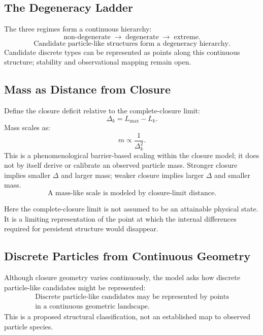 \subsection{The Degeneracy Ladder}

The three regimes form a continuous hierarchy:
\begin{equation}
  \text{non-degenerate} \;\rightarrow\; \text{degenerate} \;\rightarrow\; \text{extreme.}
\end{equation}
\begin{equation}
  \boxed{\text{Candidate particle-like structures form a degeneracy hierarchy.}}
\end{equation}
Candidate discrete types can be represented as points along this continuous
structure; stability and observational mapping remain open.

\subsection{Mass as Distance from Closure}

Define the closure deficit relative to the complete-closure limit:
\begin{equation}
  \Delta_k = L_{\max} - L_k.
\end{equation}
Mass scales as:
\begin{equation}
  \label{eq:mass}
  m \propto \frac{1}{\Delta_k^2}.
\end{equation}
This is a phenomenological barrier-based scaling within the closure model; it
does not by itself derive or calibrate an observed particle mass.
Stronger closure implies smaller $\Delta$ and larger mass;
weaker closure implies larger $\Delta$ and smaller mass.
\begin{equation}
  \boxed{\text{A mass-like scale is modeled by closure-limit distance.}}
\end{equation}

Here the complete-closure limit is not assumed to be an attainable physical
state.
It is a limiting representation of the point at which the internal differences
required for persistent structure would disappear.

\subsection{Discrete Particles from Continuous Geometry}

Although closure geometry varies continuously, the model asks how discrete
particle-like candidates might be represented:
\begin{equation}
  \boxed{\begin{gathered}
    \text{Discrete particle-like candidates may be represented by points} \\
    \text{in a continuous geometric landscape.}
  \end{gathered}}
\end{equation}
This is a proposed structural classification, not an established map to
observed particle species.
